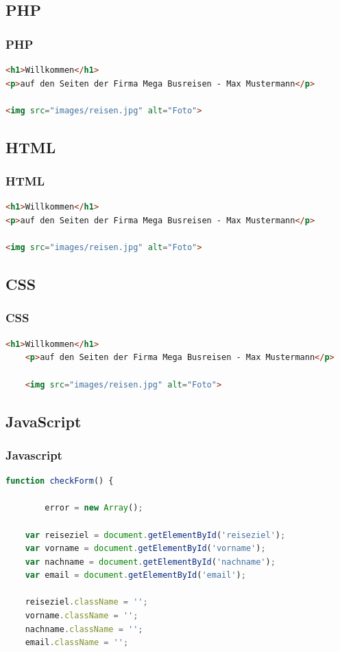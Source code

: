 \documentclass[xcolor=dvipsnames]{beamer}
\begin{document}
\subsection{PHP}
\begin{frame}[fragile]
\frametitle{PHP}

\begin{lstlisting}[language=HTML]
<h1>Willkommen</h1>
<p>auf den Seiten der Firma Mega Busreisen - Max Mustermann</p>

<img src="images/reisen.jpg" alt="Foto">

\end{lstlisting}
\end{frame}

\subsection{HTML}
\begin{frame}[fragile]
\frametitle{HTML}

\begin{lstlisting}[language=HTML]
<h1>Willkommen</h1>
<p>auf den Seiten der Firma Mega Busreisen - Max Mustermann</p>

<img src="images/reisen.jpg" alt="Foto">

\end{lstlisting}
\end{frame}

\subsection{CSS}
\begin{frame}[fragile]
\frametitle{CSS}

\begin{lstlisting}[language=HTML]
<h1>Willkommen</h1>
	<p>auf den Seiten der Firma Mega Busreisen - Max Mustermann</p>

	<img src="images/reisen.jpg" alt="Foto">

\end{lstlisting}
\end{frame}

\subsection{JavaScript}
\begin{frame}[fragile]
\frametitle{Javascript}

\begin{lstlisting}[language=javascript]
function checkForm() {

		error = new Array();

	var reiseziel = document.getElementById('reiseziel');
	var vorname = document.getElementById('vorname');
	var nachname = document.getElementById('nachname');
	var email = document.getElementById('email');

	reiseziel.className = '';
	vorname.className = '';
	nachname.className = '';
	email.className = '';
	


\end{lstlisting}
\end{frame}
\end{document}

